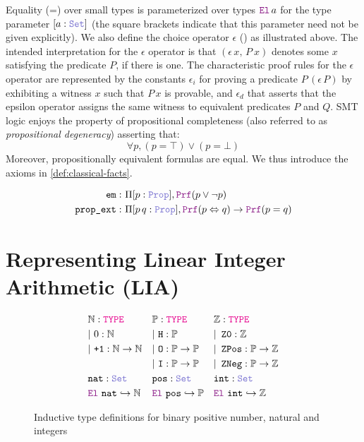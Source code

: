 Equality (=) over small types is parameterized over types
$\el\,a$ for the type parameter $[a : \set{}]$ (the square brackets indicate that this parameter need not be given explicitly).
We also define the choice operator $\epsilon$ (\cite[\S 2.1]{alethespec}) as illustrated above.
The intended interpretation for the $\epsilon$ operator is that $(\epsilon\,x,\, P~x)$ denotes some $x$ satisfying the predicate $P$, if there is one.
The characteristic proof rules for the $\epsilon$ operator are represented by
the constants $\epsilon_i$ for proving a predicate $P\,(\epsilon\,P)$ by exhibiting a witness $x$ such that $P\,x$ is provable,
and $\epsilon_d$ that asserts that the epsilon operator assigns the same witness to equivalent predicates $P$ and $Q$.
SMT logic enjoys the property of propositional completeness (also referred to as \emph{propositional degeneracy}) asserting that:
 \[
  \forall p,(p = \top) \lor (p = \bot) 
\]
Moreover, propositionally equivalent formulas are equal. We thus introduce the axioms in \cref{def:classical-facts}.

\begin{definition}
\begin{align*}
\texttt{em}:\ & \Pi [p: \prop], \prf (p \lor \neg p) \\
\texttt{prop\_ext}:\ & \Pi [p\,q: \prop], \prf (p \Leftrightarrow q ) \rightarrow \prf (p = q)
\end{align*}
\label{def:classical-facts}
\end{definition}

\section{Representing Linear Integer Arithmetic (\textbf{LIA})}
\label{ssec:encoding-lia}

\begin{figure}
\centering
\begin{align*}\label{eq:eq1}
&\N: \type & &\bb{P}: \type & &\Z: \type \\
&|~0: \N  & &|~\tt{H} : \bb{P} & &|~\ZO: \Z \\
&|~\tt{+1}:\N \ra \N & &|~\tt{O}: \bb{P} \ra \bb{P} & &|~\ZPos: \bb{P} \ra \Z \\
& & &|~\tt{I}: \bb{P} \ra \bb{P} & &|~\ZNeg: \bb{P} \ra \Z \\
&\tt{nat}: \set & &\tt{pos}: \set & &\tt{int}: \set \\
&\el~\tt{nat} \re \N & &\el~\tt{pos} \re \bb{P} & &\el~\tt{int} \re \Z 
\end{align*}
\caption{Inductive type definitions for binary positive number, natural and integers}
\label{fig:sorts-constructors}
\end{figure}


